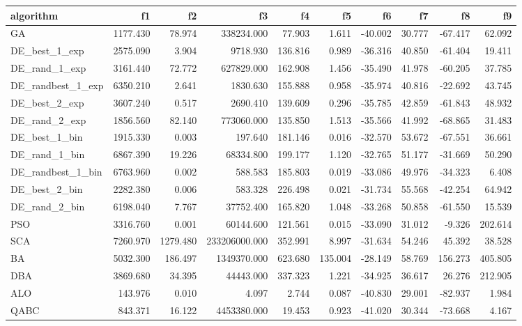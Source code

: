 \documentclass[12pt]{article}
\begin{document}
    \begin{table}[H]
        \centering
        \tiny 
        
        \begin{adjustbox}{width=1\textwidth}

\begin{tabular}{lrrrrrrrrr}
\toprule
         algorithm &       f1 &       f2 &            f3 &      f4 &      f5 &      f6 &     f7 &      f8 &      f9 \\
\midrule
                GA & 1177.430 &   78.974 &    338234.000 &  77.903 &   1.611 & -40.002 & 30.777 & -67.417 &  62.092 \\
     DE\_best\_1\_exp & 2575.090 &    3.904 &      9718.930 & 136.816 &   0.989 & -36.316 & 40.850 & -61.404 &  19.411 \\
     DE\_rand\_1\_exp & 3161.440 &   72.772 &    627829.000 & 162.908 &   1.456 & -35.490 & 41.978 & -60.205 &  37.785 \\
 DE\_randbest\_1\_exp & 6350.210 &    2.641 &      1830.630 & 155.888 &   0.958 & -35.974 & 40.816 & -22.692 &  43.745 \\
     DE\_best\_2\_exp & 3607.240 &    0.517 &      2690.410 & 139.609 &   0.296 & -35.785 & 42.859 & -61.843 &  48.932 \\
     DE\_rand\_2\_exp & 1856.560 &   82.140 &    773060.000 & 135.850 &   1.513 & -35.566 & 41.992 & -68.865 &  31.483 \\
     DE\_best\_1\_bin & 1915.330 &    0.003 &       197.640 & 181.146 &   0.016 & -32.570 & 53.672 & -67.551 &  36.661 \\
     DE\_rand\_1\_bin & 6867.390 &   19.226 &     68334.800 & 199.177 &   1.120 & -32.765 & 51.177 & -31.669 &  50.290 \\
 DE\_randbest\_1\_bin & 6763.960 &    0.002 &       588.583 & 185.803 &   0.019 & -33.086 & 49.976 & -34.323 &   6.408 \\
     DE\_best\_2\_bin & 2282.380 &    0.006 &       583.328 & 226.498 &   0.021 & -31.734 & 55.568 & -42.254 &  64.942 \\
     DE\_rand\_2\_bin & 6198.040 &    7.767 &     37752.400 & 165.820 &   1.048 & -33.268 & 50.858 & -61.550 &  15.539 \\
               PSO & 3316.760 &    0.001 &     60144.600 & 121.561 &   0.015 & -33.090 & 31.012 &  -9.326 & 202.614 \\
               SCA & 7260.970 & 1279.480 & 233206000.000 & 352.991 &   8.997 & -31.634 & 54.246 &  45.392 &  38.528 \\
                BA & 5032.300 &  186.497 &   1349370.000 & 623.680 & 135.004 & -28.149 & 58.769 & 156.273 & 405.805 \\
               DBA & 3869.680 &   34.395 &     44443.000 & 337.323 &   1.221 & -34.925 & 36.617 &  26.276 & 212.905 \\
               ALO &  143.976 &    0.010 &         4.097 &   2.744 &   0.087 & -40.830 & 29.001 & -82.937 &   1.984 \\
              QABC &  843.371 &   16.122 &   4453380.000 &  19.453 &   0.923 & -41.020 & 30.344 & -73.668 &   4.167 \\
\bottomrule
\end{tabular}


\end{adjustbox}
\end{table}
\end{document}
